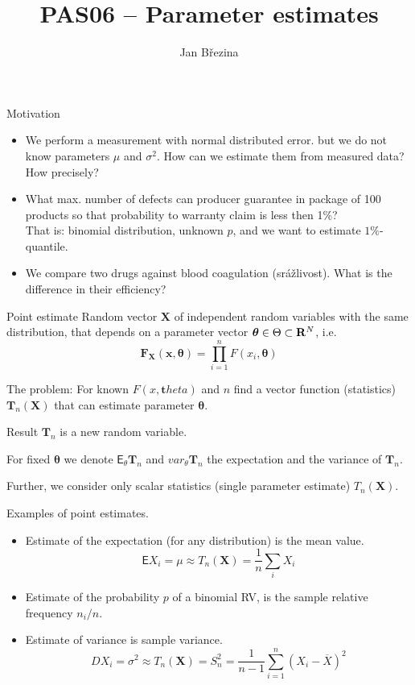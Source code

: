 \documentclass[smaller]{beamer}
\title{PAS06 -- Parameter estimates}
\author{Jan B\v rezina}
\institute %
{
  Technical University of Liberec
}
\def\Real{{\rm\bf R}}
\def\vc#1{\mathbf{\boldsymbol{#1}}}     %
\def\blue#1{{\usebeamercolor[fg]{my blue} #1}}
\def\xskip{{\vspace{2ex}}}
\def\E{\vc{\mathsf{E}}}
\begin{document}
\begin{frame}
  \titlepage
\end{frame}


\begin{frame}{Motivation}
 \begin{itemize}
  \item  We perform a measurement with normal distributed error. but we do not know parameters $\mu$ and $\sigma^2$.
    How can we estimate them from measured data? How precisely?
  \item What max. number of defects can producer guarantee in package of 100 products so that probability to warranty claim is less then 1\%?\\
        That is: binomial distribution, unknown $p$, and we want to estimate $1\%$-quantile.
  \item We compare two drugs against blood coagulation (srážlivost). What is the difference in their efficiency?
 \end{itemize}

\end{frame}


\begin{frame}{Point estimate}
Random vector $\vc X$ of independent random variables with the same distribution, that depends on a parameter vector
$\vc \theta \in \Theta \subset \Real^N$, i.e.
\[
 \vc F_{\vc X}(\vc x, \vc \theta) = \prod_{i=1}^n F(x_i,\vc \theta)
\]

\xskip
\blue{The problem:} For known $F(x,\vc theta)$ and $n$ find a vector function (statistics) $\vc T_n(\vc X)$ that can estimate parameter $\vc \theta$.

Result $\vc T_n$ is a new random variable.

For fixed $\vc \theta$ we denote $\E_\theta \vc T_n$ and $var_\theta \vc T_n$ the expectation and the variance of $\vc T_n$.

\xskip
Further,  we consider only scalar statistics (single parameter estimate) $T_n(\vc X)$.
\end{frame}

\begin{frame}{Examples of point estimates.}
 \begin{itemize}
  \item Estimate of the expectation (for any distribution) is the mean value.
        \[
            \E X_i = \mu \approx T_n(\vc X) = \frac{1}{n} \sum_i X_i
        \]

  \item Estimate of the probability $p$ of a binomial RV, is the sample relative frequency $n_i / n$.

  \item Estimate of variance is  sample variance.
        \[
            DX_i = \sigma^2 \approx T_n(\vc X) = S_n^2 =\frac{1}{n-1} \sum_{i=1}^n (X_i - \overline{X})^2 
        \]
 \end{itemize}

\end{frame}
\end{document}
